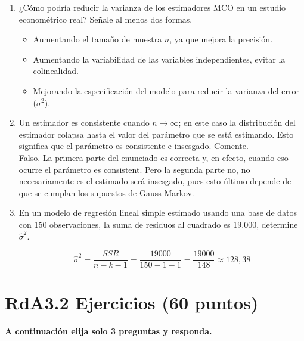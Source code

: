 \documentclass[10pt,a4paper]{article}
\begin{document}
\begin{enumerate}
    \item  ¿Cómo podría reducir la varianza de los estimadores MCO en un estudio econométrico real? Señale al menos dos formas.

{\color{blue}
\begin{itemize}
    \item Aumentando el tamaño de muestra $n$, ya que mejora la precisión.
    \item Aumentando la variabilidad de las variables independientes, evitar la colinealidad.
    \item Mejorando la especificación del modelo para reducir la varianza del error ($\sigma^2$).

\end{itemize}}
    \item 
     Un estimador es consistente cuando $n \longrightarrow \infty$; en este caso la distribución del estimador colapsa hasta el valor del parámetro que se está estimando. Esto significa que el parámetro es consistente e insesgado. Comente.\\

    {\color{blue} Falso. La primera parte del enunciado es correcta y, en efecto, cuando eso ocurre el parámetro es consistent. Pero la segunda parte no, no necesariamente es el estimado será insesgado, pues esto último depende de que se cumplan los supuestos de Gauss-Markov.}

    \item   En un modelo de regresión lineal simple estimado usando una base de datos con  150 observaciones, la suma de residuos al cuadrado es 19.000, determine  $\hat{\sigma}^2$.

{\color{blue}
\[
\hat{\sigma}^2 = \frac{SSR}{n - k - 1} = \frac{19000}{150 - 1 - 1} = \frac{19000}{148} \approx 128,38
\]}

\end{enumerate}


\section{RdA3.2  Ejercicios (60 puntos)}


{\bf A continuación elija solo 3 preguntas y responda. }
\end{document}
